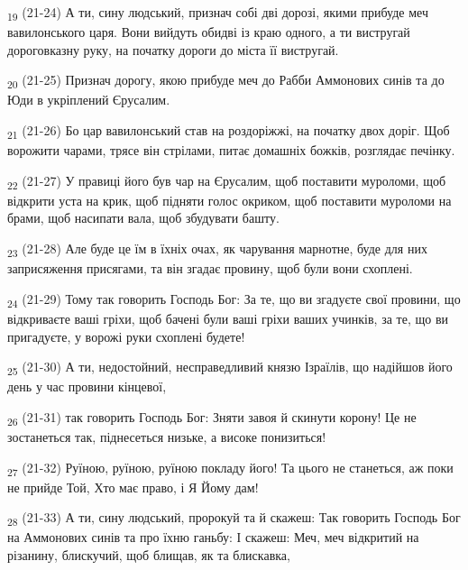 \begin{tcolorbox}
\textsubscript{19} (21-24) А ти, сину людський, признач собі дві дорозі, якими прибуде меч вавилонського царя. Вони вийдуть обидві із краю одного, а ти вистругай дороговказну руку, на початку дороги до міста її вистругай.
\end{tcolorbox}
\begin{tcolorbox}
\textsubscript{20} (21-25) Признач дорогу, якою прибуде меч до Рабби Аммонових синів та до Юди в укріплений Єрусалим.
\end{tcolorbox}
\begin{tcolorbox}
\textsubscript{21} (21-26) Бо цар вавилонський став на роздоріжжі, на початку двох доріг. Щоб ворожити чарами, трясе він стрілами, питає домашніх божків, розглядає печінку.
\end{tcolorbox}
\begin{tcolorbox}
\textsubscript{22} (21-27) У правиці його був чар на Єрусалим, щоб поставити муроломи, щоб відкрити уста на крик, щоб підняти голос окриком, щоб поставити муроломи на брами, щоб насипати вала, щоб збудувати башту.
\end{tcolorbox}
\begin{tcolorbox}
\textsubscript{23} (21-28) Але буде це їм в їхніх очах, як чарування марнотне, буде для них заприсяження присягами, та він згадає провину, щоб були вони схоплені.
\end{tcolorbox}
\begin{tcolorbox}
\textsubscript{24} (21-29) Тому так говорить Господь Бог: За те, що ви згадуєте свої провини, що відкриваєте ваші гріхи, щоб бачені були ваші гріхи ваших учинків, за те, що ви пригадуєте, у ворожі руки схоплені будете!
\end{tcolorbox}
\begin{tcolorbox}
\textsubscript{25} (21-30) А ти, недостойний, несправедливий князю Ізраїлів, що надійшов його день у час провини кінцевої,
\end{tcolorbox}
\begin{tcolorbox}
\textsubscript{26} (21-31) так говорить Господь Бог: Зняти завоя й скинути корону! Це не зостанеться так, піднесеться низьке, а високе понизиться!
\end{tcolorbox}
\begin{tcolorbox}
\textsubscript{27} (21-32) Руїною, руїною, руїною покладу його! Та цього не станеться, аж поки не прийде Той, Хто має право, і Я Йому дам!
\end{tcolorbox}
\begin{tcolorbox}
\textsubscript{28} (21-33) А ти, сину людський, пророкуй та й скажеш: Так говорить Господь Бог на Аммонових синів та про їхню ганьбу: І скажеш: Меч, меч відкритий на різанину, блискучий, щоб блищав, як та блискавка,
\end{tcolorbox}
